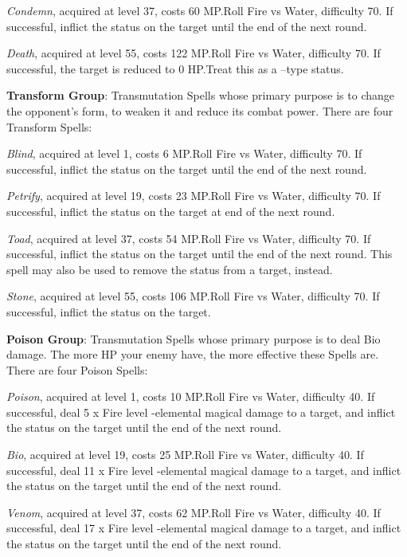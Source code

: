 \begin{multicols}{2}
    \textit{Condemn}, acquired at level 37, costs 60 MP.\@{}Roll Fire vs Water, difficulty 70. If successful, inflict the  status on the target until the end of the next round.
    
    \textit{Death}, acquired at level 55, costs 122 MP.\@{}Roll Fire vs Water, difficulty 70. If successful, the target is reduced to 0 HP.\@{}Treat this as a –type status.
    
    \textbf{Transform Group}: Transmutation Spells whose primary purpose is to change the opponent’s form, to weaken it and reduce its combat power. There are four Transform Spells:
    
    \textit{Blind}, acquired at level 1, costs 6 MP.\@{}Roll Fire vs Water, difficulty 70. If successful, inflict the  status on the target until the end of the next round.
    
    \textit{Petrify}, acquired at level 19, costs 23 MP.\@{}Roll Fire vs Water, difficulty 70. If successful, inflict the  status on the target at end of the next round.
    
    \textit{Toad}, acquired at level 37, costs 54 MP.\@{}Roll Fire vs Water, difficulty 70. If successful, inflict the  status on the target until the end of the next round. This spell may also be used to remove the  status from a target, instead.
    
    \textit{Stone}, acquired at level 55, costs 106 MP.\@{}Roll Fire vs Water, difficulty 70. If successful, inflict the  status on the target.
    
    \textbf{Poison Group}: Transmutation Spells whose primary purpose is to deal Bio damage. The more HP your enemy have, the more effective these Spells are. There are four Poison Spells:
    
    \textit{Poison}, acquired at level 1, costs 10 MP.\@{}Roll Fire vs Water, difficulty 40. If successful, deal 5 x Fire level -elemental magical damage to a target, and inflict the  status on the target until the end of the next round.
    
    \textit{Bio}, acquired at level 19, costs 25 MP.\@{}Roll Fire vs Water, difficulty 40. If successful, deal 11 x Fire level -elemental magical damage to a target, and inflict the  status on the target until the end of the next round.
    
    \textit{Venom}, acquired at level 37, costs 62 MP.\@{}Roll Fire vs Water, difficulty 40. If successful, deal 17 x Fire level -elemental magical damage to a target, and inflict the  status on the target until the end of the next round.
    

\end{multicols}
